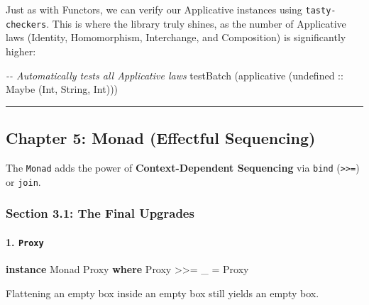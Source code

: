 \documentclass[
]{article}
\newenvironment{Shaded}{}{}
\newcommand{\CommentTok}[1]{\textcolor[rgb]{0.38,0.63,0.69}{\textit{#1}}}
\newcommand{\DataTypeTok}[1]{\textcolor[rgb]{0.56,0.13,0.00}{#1}}
\newcommand{\FunctionTok}[1]{\textcolor[rgb]{0.02,0.16,0.49}{#1}}
\newcommand{\KeywordTok}[1]{\textcolor[rgb]{0.00,0.44,0.13}{\textbf{#1}}}
\newcommand{\NormalTok}[1]{#1}
\newcommand{\OperatorTok}[1]{\textcolor[rgb]{0.40,0.40,0.40}{#1}}
\newcommand{\OtherTok}[1]{\textcolor[rgb]{0.00,0.44,0.13}{#1}}
\begin{document}
Just as with Functors, we can verify our Applicative instances using
\texttt{tasty-checkers}. This is where the library truly shines, as the
number of Applicative laws (Identity, Homomorphism, Interchange, and
Composition) is significantly higher:

\begin{Shaded}
\begin{Highlighting}[]
  \CommentTok{{-}{-} Automatically tests all Applicative laws}
\NormalTok{  testBatch (applicative (}\FunctionTok{undefined}\OtherTok{ ::} \DataTypeTok{Maybe}\NormalTok{ (}\DataTypeTok{Int}\NormalTok{, }\DataTypeTok{String}\NormalTok{, }\DataTypeTok{Int}\NormalTok{)))}
\end{Highlighting}
\end{Shaded}

\begin{center}\rule{0.5\linewidth}{0.5pt}\end{center}

\subsection{Chapter 5: Monad (Effectful
Sequencing)}\label{chapter-5-monad-effectful-sequencing}

The \texttt{Monad} adds the power of \textbf{Context-Dependent
Sequencing} via \texttt{bind} (\texttt{\textgreater{}\textgreater{}=})
or \texttt{join}.

\subsubsection{Section 3.1: The Final
Upgrades}\label{section-3.1-the-final-upgrades}

\paragraph{\texorpdfstring{1. \texttt{Proxy}}{1. Proxy}}\label{proxy-1}

\begin{Shaded}
\begin{Highlighting}[]
\KeywordTok{instance} \DataTypeTok{Monad} \DataTypeTok{Proxy} \KeywordTok{where}
    \DataTypeTok{Proxy} \OperatorTok{\textgreater{}\textgreater{}=}\NormalTok{ \_ }\OtherTok{=} \DataTypeTok{Proxy}
\end{Highlighting}
\end{Shaded}

Flattening an empty box inside an empty box still yields an empty box.
\end{document}

